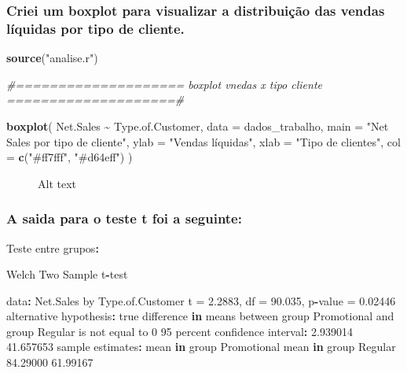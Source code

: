 \documentclass[
]{article}
\makeatletter
\newenvironment{Shaded}{\begin{snugshade}}{\end{snugshade}}
\newcommand{\AttributeTok}[1]{\textcolor[rgb]{0.13,0.29,0.53}{#1}}
\newcommand{\CommentTok}[1]{\textcolor[rgb]{0.56,0.35,0.01}{\textit{#1}}}
\newcommand{\ControlFlowTok}[1]{\textcolor[rgb]{0.13,0.29,0.53}{\textbf{#1}}}
\newcommand{\DecValTok}[1]{\textcolor[rgb]{0.00,0.00,0.81}{#1}}
\newcommand{\FloatTok}[1]{\textcolor[rgb]{0.00,0.00,0.81}{#1}}
\newcommand{\FunctionTok}[1]{\textcolor[rgb]{0.13,0.29,0.53}{\textbf{#1}}}
\newcommand{\NormalTok}[1]{#1}
\newcommand{\OtherTok}[1]{\textcolor[rgb]{0.56,0.35,0.01}{#1}}
\newcommand{\SpecialCharTok}[1]{\textcolor[rgb]{0.81,0.36,0.00}{\textbf{#1}}}
\newcommand{\StringTok}[1]{\textcolor[rgb]{0.31,0.60,0.02}{#1}}
\newcommand*\pandocbounded[1]{%
  \sbox\pandoc@box{#1}%
  \Gscale@div\@tempa{\textheight}{\dimexpr\ht\pandoc@box+\dp\pandoc@box\relax}%
  \Gscale@div\@tempb{\linewidth}{\wd\pandoc@box}%
  \ifdim\@tempb\p@<\@tempa\p@\let\@tempa\@tempb\fi%
  \ifdim\@tempa\p@<\p@\scalebox{\@tempa}{\usebox\pandoc@box}%
  \else\usebox{\pandoc@box}%
  \fi%
}
\makeatother
\begin{document}
\subsubsection{Criei um boxplot para visualizar a distribuição das
vendas líquidas por tipo de
cliente.}\label{criei-um-boxplot-para-visualizar-a-distribuiuxe7uxe3o-das-vendas-luxedquidas-por-tipo-de-cliente.}

\begin{Shaded}
\begin{Highlighting}[]
\FunctionTok{source}\NormalTok{(}\StringTok{"analise.r"}\NormalTok{)}

\CommentTok{\#==================== boxplot vnedas x tipo cliente ====================\#}

\FunctionTok{boxplot}\NormalTok{(}
\NormalTok{  Net.Sales }\SpecialCharTok{\textasciitilde{}}\NormalTok{ Type.of.Customer,}
  \AttributeTok{data =}\NormalTok{ dados\_trabalho,}
  \AttributeTok{main =} \StringTok{"Net Sales por tipo de cliente"}\NormalTok{,}
  \AttributeTok{ylab =} \StringTok{"Vendas líquidas"}\NormalTok{,}
  \AttributeTok{xlab =} \StringTok{"Tipo de clientes"}\NormalTok{,}
  \AttributeTok{col =} \FunctionTok{c}\NormalTok{(}\StringTok{"\#ff7fff"}\NormalTok{, }\StringTok{"\#d64eff"}\NormalTok{)}
\NormalTok{)}
\end{Highlighting}
\end{Shaded}

\begin{figure}
\centering
\pandocbounded{\texttt{[image: 6.png]}}
\caption{Alt text}
\end{figure}

\subsubsection{A saida para o teste t foi a
seguinte:}\label{a-saida-para-o-teste-t-foi-a-seguinte}

\begin{Shaded}
\begin{Highlighting}[]
\NormalTok{Teste entre grupos}\SpecialCharTok{:}

\NormalTok{        Welch Two Sample t}\SpecialCharTok{{-}}\NormalTok{test}

\NormalTok{data}\SpecialCharTok{:}\NormalTok{  Net.Sales by Type.of.Customer}
\NormalTok{t }\OtherTok{=} \FloatTok{2.2883}\NormalTok{, df }\OtherTok{=} \FloatTok{90.035}\NormalTok{, p}\SpecialCharTok{{-}}\NormalTok{value }\OtherTok{=} \FloatTok{0.02446}
\NormalTok{alternative hypothesis}\SpecialCharTok{:}\NormalTok{ true difference }\ControlFlowTok{in}\NormalTok{ means between group Promotional and group Regular is not equal to }\DecValTok{0}
\DecValTok{95}\NormalTok{ percent confidence interval}\SpecialCharTok{:}
  \FloatTok{2.939014} \FloatTok{41.657653}
\NormalTok{sample estimates}\SpecialCharTok{:}
\NormalTok{mean }\ControlFlowTok{in}\NormalTok{ group Promotional     mean }\ControlFlowTok{in}\NormalTok{ group Regular }
                 \FloatTok{84.29000}                  \FloatTok{61.99167}
\end{Highlighting}
\end{Shaded}
\end{document}
